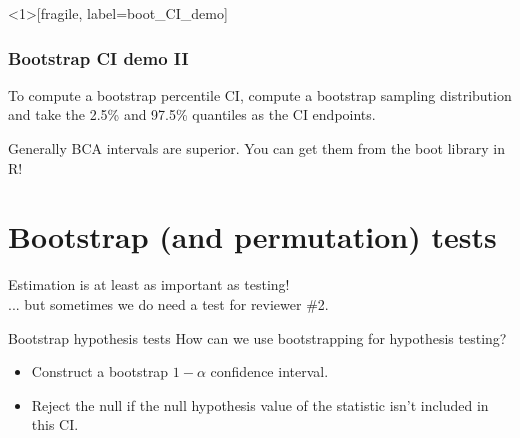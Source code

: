 \documentclass{beamer} %
\begin{document}

\begin{frame}<1>[fragile, label=boot_CI_demo]
\frametitle{Bootstrap CI demo II}
\begin{figure}
\centering
{}
\end{figure}
\end{frame}

\begin{frame}[standout]
To compute a bootstrap percentile CI, compute a bootstrap sampling distribution and take the 2.5\% and 97.5\% quantiles as the CI endpoints.
\end{frame}


\begin{frame}[standout]
Generally BCA intervals are superior. You can get them from the boot library in R!
\end{frame}


\section{Bootstrap (and permutation) tests}

\begin{frame}[standout]
Estimation is at least as important as testing! \\[1em]
... but sometimes we do need a test for reviewer \#2.
\end{frame}

\begin{frame}{Bootstrap hypothesis tests}
How can we use bootstrapping for hypothesis testing?
\begin{itemize}[<+(1)->]
\item Construct a bootstrap $1-\alpha$ confidence interval.
\item Reject the null if the null hypothesis value of the statistic isn't included in this CI.
\end{itemize}
\end{frame}
\end{document}
